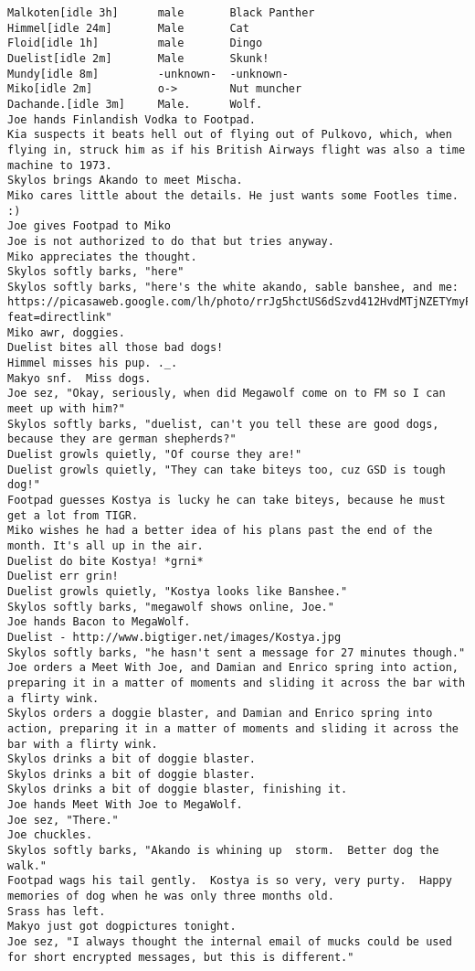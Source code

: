 \begin{verbatim}
Malkoten[idle 3h]      male       Black Panther
Himmel[idle 24m]       Male       Cat
Floid[idle 1h]         male       Dingo
Duelist[idle 2m]       Male       Skunk!
Mundy[idle 8m]         -unknown-  -unknown-
Miko[idle 2m]          o->        Nut muncher
Dachande.[idle 3m]     Male.      Wolf.
Joe hands Finlandish Vodka to Footpad.
Kia suspects it beats hell out of flying out of Pulkovo, which, when flying in, struck him as if his British Airways flight was also a time machine to 1973.
Skylos brings Akando to meet Mischa.
Miko cares little about the details. He just wants some Footles time. :)
Joe gives Footpad to Miko
Joe is not authorized to do that but tries anyway.
Miko appreciates the thought.
Skylos softly barks, "here"
Skylos softly barks, "here's the white akando, sable banshee, and me: https://picasaweb.google.com/lh/photo/rrJg5hctUS6dSzvd412HvdMTjNZETYmyPJy0liipFm0?feat=directlink"
Miko awr, doggies.
Duelist bites all those bad dogs!
Himmel misses his pup. ._.
Makyo snf.  Miss dogs.
Joe sez, "Okay, seriously, when did Megawolf come on to FM so I can meet up with him?"
Skylos softly barks, "duelist, can't you tell these are good dogs, because they are german shepherds?"
Duelist growls quietly, "Of course they are!"
Duelist growls quietly, "They can take biteys too, cuz GSD is tough dog!"
Footpad guesses Kostya is lucky he can take biteys, because he must get a lot from TIGR.
Miko wishes he had a better idea of his plans past the end of the month. It's all up in the air.
Duelist do bite Kostya! *grni*
Duelist err grin!
Duelist growls quietly, "Kostya looks like Banshee."
Skylos softly barks, "megawolf shows online, Joe."
Joe hands Bacon to MegaWolf.
Duelist - http://www.bigtiger.net/images/Kostya.jpg
Skylos softly barks, "he hasn't sent a message for 27 minutes though."
Joe orders a Meet With Joe, and Damian and Enrico spring into action, preparing it in a matter of moments and sliding it across the bar with a flirty wink.
Skylos orders a doggie blaster, and Damian and Enrico spring into action, preparing it in a matter of moments and sliding it across the bar with a flirty wink.
Skylos drinks a bit of doggie blaster.
Skylos drinks a bit of doggie blaster.
Skylos drinks a bit of doggie blaster, finishing it.
Joe hands Meet With Joe to MegaWolf.
Joe sez, "There."
Joe chuckles.
Skylos softly barks, "Akando is whining up  storm.  Better dog the walk."
Footpad wags his tail gently.  Kostya is so very, very purty.  Happy memories of dog when he was only three months old.
Srass has left.
Makyo just got dogpictures tonight.
Joe sez, "I always thought the internal email of mucks could be used for short encrypted messages, but this is different."

\end{verbatim}
